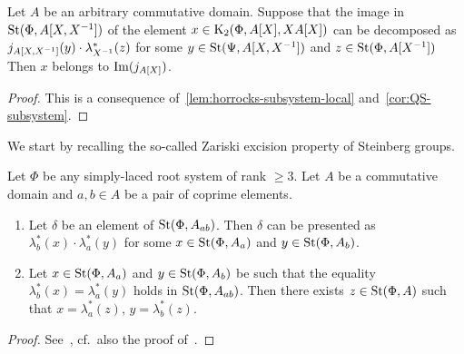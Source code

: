 \begin{cor} \label{cor:horrocks--ingredient}
    Let $A$ be an arbitrary commutative domain.
    Suppose that the image in $\operatorname{St}(\Phi, A[X, X^{-1}])$ of the element $x \in \operatorname{K}_2(\Phi, A[X], XA[X])$
    can be decomposed as $j_{A[X, X^{-1}]}(y) \cdot \lambda_{X^{-1}}^*(z)$ for
    some $y \in \operatorname{St}(\Psi, A[X, X^{-1}])$ and $z \in \operatorname{St}(\Phi, A[X^{-1}])$
    Then $x$ belongs to $\operatorname{Im}(j_{A[X]})$.
\end{cor}
\begin{proof}
    This is a consequence of~\cref{lem:horrocks-subsystem-local} and~\cref{cor:QS-subsystem}.
\end{proof}

We start by recalling the so-called Zariski excision property of Steinberg groups.
\begin{lemma} \label{lem:zariski-glueing}
Let $\Phi$ be any simply-laced root system of rank $\geq 3$.
Let $A$ be a commutative domain and $a, b \in A$ be a pair of coprime elements.
\begin{enumerate}
    \item Let $\delta$ be an element of $\operatorname{St}(\Phi, A_{ab})$.
    Then $\delta$ can be presented as $\lambda_b^*(x) \cdot \lambda_a^*(y)$ for some
    $x  \in \operatorname{St}(\Phi, A_a)$ and $y \in \operatorname{St}(\Phi, A_b)$.
    \item  Let $x \in \operatorname{St}(\Phi, A_a)$ and $y \in \operatorname{St}(\Phi, A_b)$ be such that the equality $\lambda_b^*(x) = \lambda_a^*(y)$ holds in $\operatorname{St}(\Phi, A_{ab})$.
    Then there exists $z \in \operatorname{St}(\Phi, A)$ such that $x = \lambda_a^*(z)$, $y = \lambda_b^*(z)$.
\end{enumerate}
\end{lemma}
\begin{proof}
    See~\cite[Corollary~4.5]{LSV2}, cf.\ also the proof of~\cite[Lemma~2.6]{LSV2}.
\end{proof}


